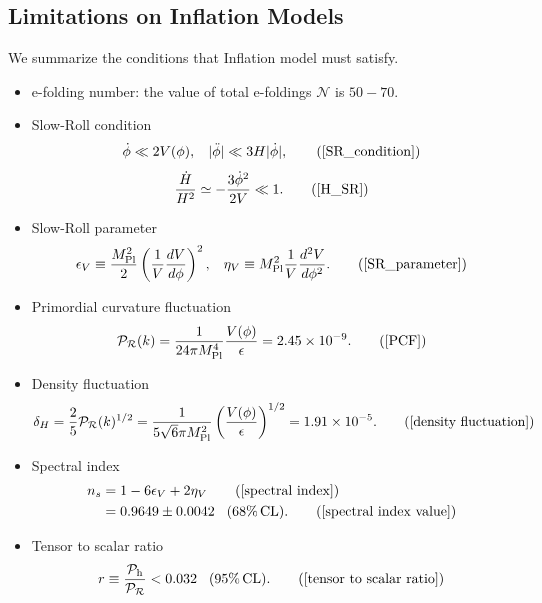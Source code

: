 \documentclass[12pt]{article}
\newcommand{\tcb}[2]{\begin{tcolorbox}[title={\textcolor{white}{#1}}, opacitybacktitle = 0, colframe=white!40!black]#2
\end{tcolorbox}}
\numberwithin{equation}{section}
\begin{document}
\subsection{Limitations on Inflation Models}
We summarize the conditions that Inflation model must satisfy.
\tcb{Summary}{
    \begin{itemize}
        \item e-folding number:
        the value of total e-foldings $\mathcal{N}$ is $50-70$. 
        \item Slow-Roll condition
        \begin{equation*}
            \dot{\phi} \ll 2V(\phi),\hspace{0.3cm} |\ddot{\phi}| \ll 3H|\dot{\phi}|, \tag{\eqref{SR_condition}}
        \end{equation*}
        \begin{equation*}
            \frac{\dot{H}}{H^2} \simeq -\frac{3\dot{\phi}^2}{2V} \ll 1. \tag{\eqref{H_SR}}
        \end{equation*}
        \item Slow-Roll parameter
        \begin{equation*}
            \epsilon_{V} \equiv \frac{M_{\textrm{Pl}}^2}{2}\left( \frac{1}{V}\frac{dV}{d\phi} \right)^2, \hspace{0.3cm} \eta_{V} \equiv M_{\textrm{Pl}}^2 \frac{1}{V}\frac{d^2V}{d\phi^2}. \tag{\eqref{SR_parameter}}
        \end{equation*}
        \item Primordial curvature fluctuation
        \begin{equation*}
            \mathcal{P}_{\mathcal{R}}(k) = \frac{1}{24\pi M_{\textrm{Pl}}^4}\frac{V(\phi)}{\epsilon} = 2.45 \times 10^{-9}.\tag{\eqref{PCF}}
        \end{equation*}
        \item Density fluctuation
        \begin{equation*}
            \delta_H = \frac{2}{5}\mathcal{P}_{\mathcal{R}}(k)^{1/2} = \frac{1}{5\sqrt{6}\pi M_{\textrm{Pl}}^2}\left( \frac{V(\phi)}{\epsilon} \right)^{1/2} = 1.91 \times 10^{-5}. \tag{\eqref{density fluctuation}}
        \end{equation*}
        \item Spectral index
        \begin{align*}
            n_s &= 1 - 6\epsilon_V + 2\eta_V \tag{\eqref{spectral index}}\\
            &= 0.9649 \pm 0.0042\hspace{0.3cm}(68\%\,\textrm{CL}). \tag{\eqref{spectral index value}}
        \end{align*}
        \item Tensor to scalar ratio
        \begin{equation}
            r \equiv \frac{\mathcal{P}_{\textrm{h}}}{\mathcal{P}_{\mathcal{R}}} < 0.032\hspace{0.3cm}(95\%\, \textrm{CL}). \tag{\eqref{tensor to scalar ratio}}
        \end{equation}
    \end{itemize}
}
\end{document}
